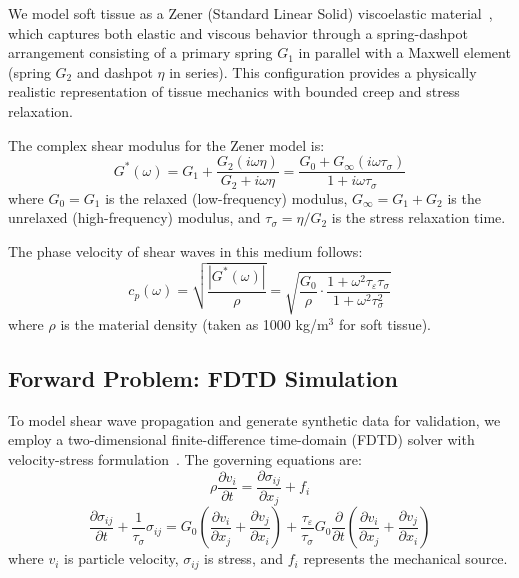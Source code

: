 \documentclass[journal]{IEEEtran}
\begin{document}
We model soft tissue as a Zener (Standard Linear Solid) viscoelastic material~\cite{lakes1998}, which captures both elastic and viscous behavior through a spring-dashpot arrangement consisting of a primary spring $G_1$ in parallel with a Maxwell element (spring $G_2$ and dashpot $\eta$ in series). This configuration provides a physically realistic representation of tissue mechanics with bounded creep and stress relaxation.

The complex shear modulus for the Zener model is:
\begin{equation}
G^*(\omega) = G_1 + \frac{G_2(i\omega\eta)}{G_2 + i\omega\eta} = \frac{G_0 + G_\infty(i\omega\tau_\sigma)}{1 + i\omega\tau_\sigma}
\end{equation}
where $G_0 = G_1$ is the relaxed (low-frequency) modulus, $G_\infty = G_1 + G_2$ is the unrelaxed (high-frequency) modulus, and $\tau_\sigma = \eta/G_2$ is the stress relaxation time.

The phase velocity of shear waves in this medium follows:
\begin{equation}
c_p(\omega) = \sqrt{\frac{|G^*(\omega)|}{\rho}} = \sqrt{\frac{G_0}{\rho} \cdot \frac{1 + \omega^2\tau_\varepsilon\tau_\sigma}{1 + \omega^2\tau_\sigma^2}}
\end{equation}
where $\rho$ is the material density (taken as 1000 kg/m$^3$ for soft tissue).

\subsection{Forward Problem: FDTD Simulation}

To model shear wave propagation and generate synthetic data for validation, we employ a two-dimensional finite-difference time-domain (FDTD) solver with velocity-stress formulation~\cite{virieux1986,taflove2005}. The governing equations are:
\begin{equation}
\rho\frac{\partial v_i}{\partial t} = \frac{\partial \sigma_{ij}}{\partial x_j} + f_i
\end{equation}
\begin{equation}
\frac{\partial \sigma_{ij}}{\partial t} + \frac{1}{\tau_\sigma}\sigma_{ij} = G_0\left(\frac{\partial v_i}{\partial x_j} + \frac{\partial v_j}{\partial x_i}\right) + \frac{\tau_\varepsilon}{\tau_\sigma}G_0\frac{\partial}{\partial t}\left(\frac{\partial v_i}{\partial x_j} + \frac{\partial v_j}{\partial x_i}\right)
\end{equation}
where $v_i$ is particle velocity, $\sigma_{ij}$ is stress, and $f_i$ represents the mechanical source.
\end{document}
